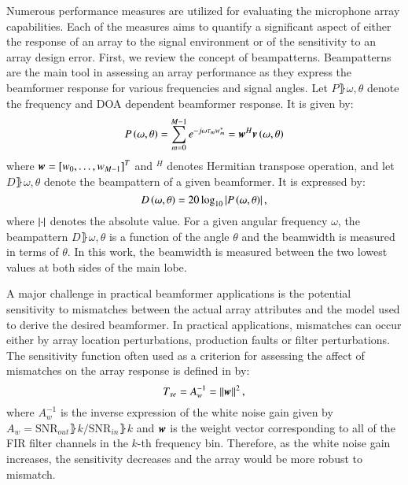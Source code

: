 Numerous performance measures are utilized for evaluating the microphone array capabilities. 
Each of the measures aims to quantify a significant aspect of either the response of an array to the signal environment or of the sensitivity to an array design error.
First, we review the concept of beampatterns. 
Beampatterns are the main tool in assessing an array performance as they express the beamformer response for various frequencies and signal angles. 
Let $P\rBrace{\omega,\theta}$ denote the frequency and DOA dependent beamformer response. It is given by:
\begin{equation}
P\left({\omega,\theta}\right)=\sum_{m=0}^{M-1}e^{-j\omega\tau_{m}w_{m}^{*}}=\boldsymbol{w}^{H}\boldsymbol{v}\left({\omega,\theta}\right)    
\end{equation}
where $\boldsymbol{w}=\left[{w_{0},\dots,w_{M-1}}\right]^{T}$ and $^{H}$ denotes Hermitian transpose operation, and let $D\rBrace{\omega,\theta}$ denote the beampattern of a given beamformer. 
It is expressed by:
\begin{equation}
D\left({\omega,\theta}\right)=20\log_{10}\left\vert P\left({\omega,\theta}\right)\right\vert,
\end{equation}
where $\left\vert\cdot\right\vert$ denotes the absolute value. 
For a given angular frequency $\omega$, the beampattern $D\rBrace{\omega,\theta}$ is a function of the angle $\theta$ and the beamwidth is measured in terms of $\theta$.
In this work, the beamwidth is measured between the two lowest values at both sides of the main lobe.
\par
A major challenge in practical beamformer applications is the potential sensitivity to mismatches between the actual array attributes and the model used to derive the desired beamformer. 
In practical applications, mismatches can occur either by array location perturbations, production faults or filter perturbations. 
The sensitivity function often used as a criterion for assessing the affect of mismatches on the array response is defined in \cite{van2004optimum} by:
\begin{equation}
T_{se}=A^{-1}_{w}=\left\vert\left\vert\boldsymbol{w}\right\vert\right\vert^{2},
\end{equation}
where $A_{w}^{-1}$ is the inverse expression of the white noise gain given by $A_{w}=\text{SNR}_{out}\rBrace{k}/\text{SNR}_{in}\rBrace{k}$ and $\boldsymbol{w}$ is the weight vector corresponding to all of the FIR filter channels in the $k$-th frequency bin. Therefore, as the white noise gain increases, the sensitivity decreases and the array would be more robust to mismatch.